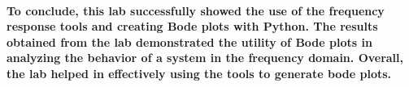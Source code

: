 \documentclass[12pt,a4paper]{article}
\begin{document}
\paragraph{To conclude, this lab successfully showed the use of the frequency response tools and creating Bode plots with Python. The results obtained from the lab demonstrated the utility of Bode plots in analyzing the behavior of a system in the frequency domain. Overall, the lab helped in effectively using the tools to generate bode plots. }







\end{document}
